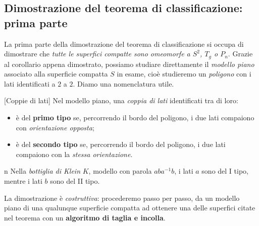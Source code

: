 \subsection{Dimostrazione del teorema di classificazione: prima parte}
La prima parte della dimostrazione del teorema di classificazione si occupa di dimostrare che \textit{tutte le superfici compatte sono omeomorfe a $S^2$, $T_g$ o $P_n$}. Grazie al corollario appena dimostrato, possiamo studiare direttamente il \textit{modello piano} associato alla superficie compatta $S$ in esame, cioè studieremo un \textit{poligono} con i lati identificati a $2$ a $2$. Diamo una nomenclatura utile.
\begin{definition}{}[Coppie di lati]
	Nel modello piano, una \textit{coppia di lati} identificati tra di loro:
	\begin{itemize}
		\item è del \textbf{primo tipo} se, percorrendo il bordo del poligono, i due lati compaiono con \textit{orientazione opposta};
		\item è del \textbf{secondo tipo} se, percorrendo il bordo del poligono, i due lati compaiono con la \textit{stessa orientazione}.
	\end{itemize}
\end{definition}
\begin{example}{n}
	Nella \textit{bottiglia di Klein} $K$, modello con parola $aba^{-1}b$, i lati $a$ sono del I tipo, mentre i lati $b$ sono del II tipo.
\end{example}
La dimostrazione è \textit{costruttiva}: procederemo passo per passo, da un modello piano di una qualunque superficie compatta ad ottenere una delle superfici citate nel teorema con un \textbf{algoritmo di taglia e incolla}.
